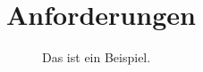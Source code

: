 %
%
%
%
\chapter{Anforderungen}\label{sec:anforderung} 

\begin{description}
	\item[] Das ist ein Beispiel.
\end{description}

